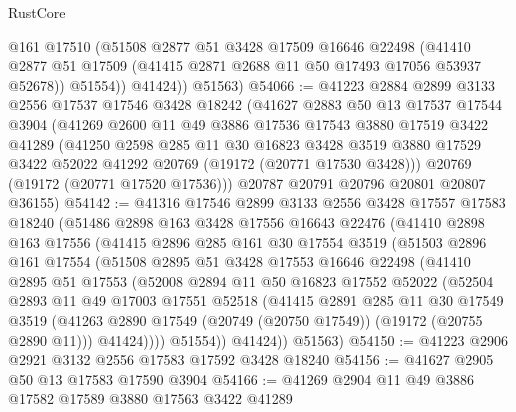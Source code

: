 \begin{lexlean}{RustCore}
\begin{coremodule}
            @161
            @17510
            (@51508
              @2877
              @51
              @3428
              @17509
              @16646
              @22498
              (@41410 @2877 @51 @17509 (@41415 @2871 @2688 @11 @50 @17493 @17056 @53937 @52678))
              @51554))
          @41424))
      @51563)
@54066 := @41223
    @2884
    @2899
    @3133
    @2556
    @17537
    @17546
    @3428
    @18242
    (@41627
      @2883
      @50
      @13
      @17537
      @17544
      @3904
      (@41269
        @2600
        @11
        @49
        @3886
        @17536
        @17543
        @3880
        @17519
        @3422
        @41289
        (@41250
          @2598
          @285
          @11
          @30
          @16823
          @3428
          @3519
          @3880
          @17529
          @3422
          @52022
          @41292
          @20769
          (@19172 (@20771 @17530 @3428)))
        @20769
        (@19172 (@20771 @17520 @17536)))
      @20787
      @20791
      @20796
      @20801
      @20807
      @36155)
@54142 := @41316
    @17546
    @2899
    @3133
    @2556
    @3428
    @17557
    @17583
    @18240
    (@51486
      @2898
      @163
      @3428
      @17556
      @16643
      @22476
      (@41410
        @2898
        @163
        @17556
        (@41415
          @2896
          @285
          @161
          @30
          @17554
          @3519
          (@51503
            @2896
            @161
            @17554
            (@51508
              @2895
              @51
              @3428
              @17553
              @16646
              @22498
              (@41410
                @2895
                @51
                @17553
                (@52008
                  @2894
                  @11
                  @50
                  @16823
                  @17552
                  @52022
                  (@52504
                    @2893
                    @11
                    @49
                    @17003
                    @17551
                    @52518
                    (@41415
                      @2891
                      @285
                      @11
                      @30
                      @17549
                      @3519
                      (@41263 @2890 @17549 (@20749 (@20750 @17549)) (@19172 (@20755 @2890 @11)))
                      @41424))))
              @51554))
          @41424))
      @51563)
@54150 := @41223 @2906 @2921 @3132 @2556 @17583 @17592 @3428 @18240
@54156 := @41627 @2905 @50 @13 @17583 @17590 @3904
@54166 := @41269 @2904 @11 @49 @3886 @17582 @17589 @3880 @17563 @3422 @41289

\end{coremodule}
\end{lexlean}
